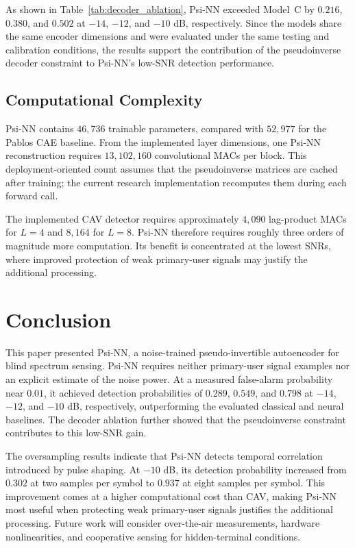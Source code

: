 \documentclass[conference]{IEEEtran}
\begin{document}
As shown in Table~\ref{tab:decoder_ablation}, Psi-NN exceeded Model~C
by $0.216$, $0.380$, and $0.502$ at $-14$, $-12$, and $-10$ dB,
respectively. Since the models share the same encoder dimensions and
were evaluated under the same testing and calibration conditions, the
results support the contribution of the pseudoinverse decoder
constraint to Psi-NN's low-SNR detection performance.

\subsection{Computational Complexity}
\label{subsec:complexity_results}

Psi-NN contains $46{,}736$ trainable parameters, compared with
$52{,}977$ for the Pablos CAE baseline. From the implemented layer
dimensions, one Psi-NN reconstruction requires $13{,}102{,}160$
convolutional MACs per block. This deployment-oriented count assumes
that the pseudoinverse matrices are cached after training; the current
research implementation recomputes them during each forward call.

The implemented CAV detector requires approximately $4{,}090$
lag-product MACs for $L=4$ and $8{,}164$ for $L=8$. Psi-NN therefore
requires roughly three orders of magnitude more computation. Its
benefit is concentrated at the lowest SNRs, where improved protection
of weak primary-user signals may justify the additional processing.

\section{Conclusion}
\label{sec:conclusion}

This paper presented Psi-NN, a noise-trained pseudo-invertible
autoencoder for blind spectrum sensing. Psi-NN requires neither
primary-user signal examples nor an explicit estimate of the noise
power. At a measured false-alarm probability near $0.01$, it achieved
detection probabilities of $0.289$, $0.549$, and $0.798$ at $-14$,
$-12$, and $-10$ dB, respectively, outperforming the evaluated
classical and neural baselines. The decoder ablation further showed
that the pseudoinverse constraint contributes to this low-SNR gain.

The oversampling results indicate that Psi-NN detects temporal
correlation introduced by pulse shaping. At $-10$ dB, its detection
probability increased from $0.302$ at two samples per symbol to $0.937$
at eight samples per symbol. This improvement comes at a higher
computational cost than CAV, making Psi-NN most useful when protecting
weak primary-user signals justifies the additional processing. Future
work will consider over-the-air measurements, hardware nonlinearities,
and cooperative sensing for hidden-terminal conditions.
\end{document}
